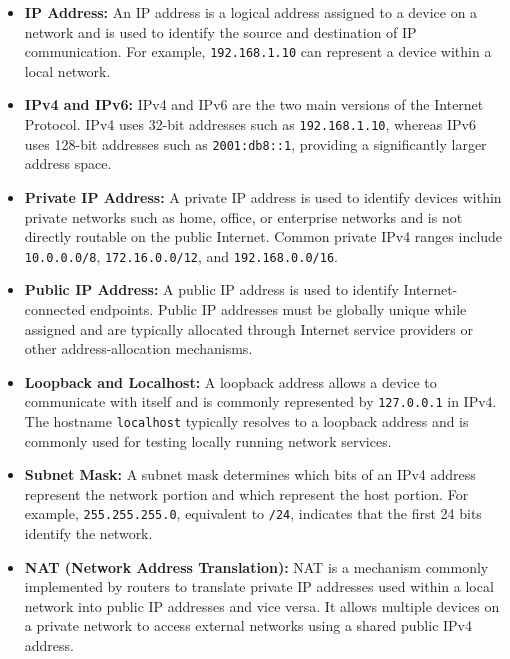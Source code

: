 \documentclass[journal]{IEEEtran}
\begin{document}
\begin{itemize}
    \item \textbf{IP Address:} An IP address is a logical address assigned to a device on a network and is used to identify the source and destination of IP communication. For example, \texttt{192.168.1.10} can represent a device within a local network.

    \item \textbf{IPv4 and IPv6:} IPv4 and IPv6 are the two main versions of the Internet Protocol. IPv4 uses 32-bit addresses such as \texttt{192.168.1.10}, whereas IPv6 uses 128-bit addresses such as \texttt{2001:db8::1}, providing a significantly larger address space.

    \item \textbf{Private IP Address:} A private IP address is used to identify devices within private networks such as home, office, or enterprise networks and is not directly routable on the public Internet. Common private IPv4 ranges include \texttt{10.0.0.0/8}, \texttt{172.16.0.0/12}, and \texttt{192.168.0.0/16}.

    \item \textbf{Public IP Address:} A public IP address is used to identify Internet-connected endpoints. Public IP addresses must be globally unique while assigned and are typically allocated through Internet service providers or other address-allocation mechanisms.

    \item \textbf{Loopback and Localhost:} A loopback address allows a device to communicate with itself and is commonly represented by \texttt{127.0.0.1} in IPv4. The hostname \texttt{localhost} typically resolves to a loopback address and is commonly used for testing locally running network services.

    \item \textbf{Subnet Mask:} A subnet mask determines which bits of an IPv4 address represent the network portion and which represent the host portion. For example, \texttt{255.255.255.0}, equivalent to \texttt{/24}, indicates that the first 24 bits identify the network.

    \item \textbf{NAT (Network Address Translation):} NAT is a mechanism commonly implemented by routers to translate private IP addresses used within a local network into public IP addresses and vice versa. It allows multiple devices on a private network to access external networks using a shared public IPv4 address.


\end{itemize}
\end{document}
